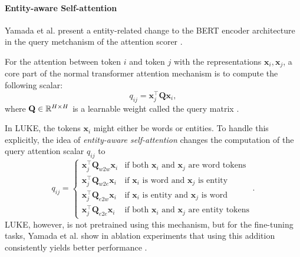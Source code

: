 \documentclass[main.tex]{subfiles}
\begin{document}
\paragraph{Entity-aware Self-attention}
\label{subsubsec:entityaware}
Yamada et al. present a entity-related change to the BERT encoder architecture in the query metchanism of the attention scorer \cite[Sec. 3.2]{yamada2020luke}.

For the attention between token $i$ and token $j$ with the representations $\mathbf x_i, \mathbf x_j$, a core part of the normal transformer attention mechanism is to compute the following scalar:
\begin{equation}
    q_{ij} = \mathbf x_j^\top \mathbf Q \mathbf x_i,
\end{equation}
where $\mathbf Q\in \mathbb R^{H\times H}$ is a learnable weight called the query matrix \cite[Sec. 3.2.1]{vaswani2017att}.

In LUKE, the tokens $\mathbf x_i$ might either be words or entities.
To handle this explicitly, the idea of \emph{entity-aware self-attention} changes the computation of the query attention scalar $q_{ij}$ to
\begin{equation}
    q_{ij} = 
    \begin{cases}
    \mathbf x_j^\top \mathbf Q_{w2w} \mathbf x_i  & \text{if both $\mathbf x_i$ and $\mathbf x_j$ are word tokens}\\
    \mathbf x_j^\top \mathbf Q_{w2e} \mathbf x_i & \text{if $\mathbf x_i$ is word and $\mathbf x_j$ is entity}\\
    \mathbf x_j^\top \mathbf Q_{e2w} \mathbf x_i & \text{if $\mathbf x_i$ is entity and $\mathbf x_j$ is word}\\
    \mathbf x_j^\top \mathbf Q_{e2e} \mathbf x_i & \text{if both $\mathbf x_i$ and $\mathbf x_j$ are entity tokens}
    \end{cases}.
\end{equation}
LUKE, however, is not pretrained using this mechanism, but for the fine-tuning tasks, Yamada et al. show in ablation experiments that using this addition consistently yields better performance \cite[Sec. 5.2]{yamada2020luke}.
\end{document}
